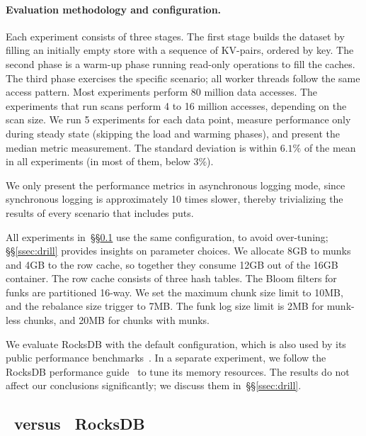 \paragraph{Evaluation methodology and configuration.} Each experiment consists of three stages. The first stage builds 
the dataset by filling an initially empty store with a sequence of KV-pairs, ordered by key. The second phase is a warm-up phase running read-only operations to fill the caches. The third
phase exercises the specific scenario; all worker threads follow the same access pattern. Most experiments 
perform 80 million data accesses. The experiments that run scans perform 4 to 16 million accesses, depending 
on the scan size. We run 5 experiments for each data point, measure performance only during steady state (skipping the 
load and warming phases), and present the median metric measurement. The standard deviation is within $6.1\%$ 
of the mean in all experiments (in most of them, below $3\%$). 

We only present the performance metrics in asynchronous logging mode, since synchronous logging 
is approximately 10 times slower, thereby trivializing the results of every scenario that includes puts. 

All experiments in~\S\S\ref{ssec:results} use the same \sys\/ configuration, to avoid 
over-tuning; \S\S\ref{ssec:drill} provides insights on parameter choices.
We allocate 8GB to munks and 4GB to the row cache,
so together they consume 12GB out of the 16GB container. 
The row cache consists of three hash tables.  
The Bloom filters for funks are partitioned 16-way.  
We set the \sys\/ maximum chunk size limit to 10MB, and the rebalance size trigger to 7MB. 
The funk log size limit is 2MB for munk-less chunks, and 20MB for chunks with munks. 

We evaluate RocksDB with the default configuration, which is also used by its public performance benchmarks~\cite{RocksDBPerf}.
In a separate experiment, we follow the RocksDB performance guide~\cite{RocksDBMemoryTuning} to tune its memory resources.  
The results do not affect our conclusions significantly; we discuss them in~\S\S\ref{ssec:drill}.

\subsection{\sys\ versus \ RocksDB}
\label{ssec:results} 

